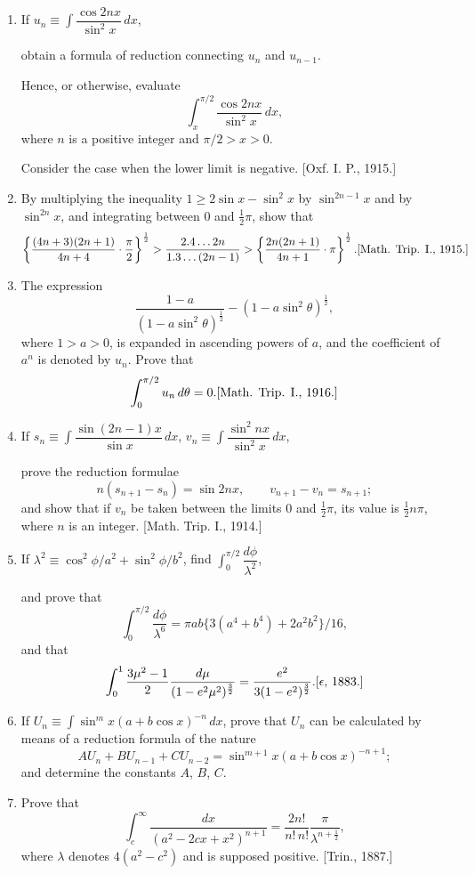 \documentclass[11pt, a4paper]{article}
\newcommand{\source}[1]{\hfill\textnormal{[#1]}}
\begin{document}
\begin{enumerate}[leftmargin=2em]
\item If $u_n\equiv\displaystyle\int \dfrac{\cos2nx}{\sin^2x}\,dx$,

obtain a formula of reduction connecting $u_n$ and $u_{n-1}$.

Hence, or otherwise, evaluate
\[
\int_x^{\pi/2}\dfrac{\cos2nx}{\sin^2x}\,dx,
\]
where $n$ is a positive integer and $\pi/2>x>0$.

Consider the case when the lower limit is negative. \source{Oxf. I. P., 1915.}

\item By multiplying the inequality $1\geqslant2\sin x-\sin^2x$ by $\sin^{2n-1}x$ and by $\sin^{2n}x$, and integrating between $0$ and $\tfrac12\pi$, show that
\[
\left\{\dfrac{(4n+3)(2n+1)}{4n+4}\cdot\dfrac\pi2\right\}^{\frac12}>\dfrac{2.4\dots2n}{1.3\dots(2n-1)}>\left\{\dfrac{2n(2n+1)}{4n+1}\cdot\pi\right\}^{\frac12}. \source{Math. Trip. I., 1915.}
\]

\item The expression
\[
\dfrac{1-a}{(1-a\sin^2\theta)^{\frac12}}-(1-a\sin^2\theta)^{\frac12},
\]
where $1>a>0$, is expanded in ascending powers of $a$, and the coefficient of $a^n$ is denoted by $u_n$. Prove that
\[
\int_0^{\pi/2}u_n\,d\theta=0. \source{Math. Trip. I., 1916.}
\]

\item If $s_n\equiv\displaystyle\int \dfrac{\sin(2n-1)x}{\sin x}\,dx$, $v_n\equiv\displaystyle\int \dfrac{\sin^2nx}{\sin^2x}\,dx$,

prove the reduction formulae
\[
n(s_{n+1}-s_n)=\sin2nx, \qquad v_{n+1}-v_n=s_{n+1};
\]
and show that if $v_n$ be taken between the limits $0$ and $\tfrac12\pi$, its value is $\tfrac12n\pi$, where $n$ is an integer. \source{Math. Trip. I., 1914.}

\item If $\lambda^2\equiv\cos^2\phi/a^2+\sin^2\phi/b^2$, find $\displaystyle\int_0^{\pi/2}\dfrac{d\phi}{\lambda^2}$,

and prove that
\[
\int_0^{\pi/2}\dfrac{d\phi}{\lambda^6}=\pi ab\{3(a^4+b^4)+2a^2b^2\}/16,
\]
and that
\[
\int_0^1 \dfrac{3\mu^2-1}{2}\dfrac{d\mu}{(1-e^2\mu^2)^{\frac32}}=\dfrac{e^2}{3(1-e^2)^{\frac32}}. \source{$\epsilon$, 1883.}
\]

\item If $U_n\equiv\displaystyle\int \sin^mx(a+b\cos x)^{-n}\,dx$, prove that $U_n$ can be calculated by means of a reduction formula of the nature
\[
AU_n+BU_{n-1}+CU_{n-2}=\sin^{m+1}x(a+b\cos x)^{-n+1};
\]
and determine the constants $A$, $B$, $C$.

\item Prove that
\[
\int_c^\infty \dfrac{dx}{(a^2-2cx+x^2)^{n+1}}=\dfrac{2n!}{n!\,n!}\dfrac{\pi}{\lambda^{n+\frac12}},
\]
where $\lambda$ denotes $4(a^2-c^2)$ and is supposed positive. \source{Trin., 1887.}

\end{enumerate}
\end{document}
